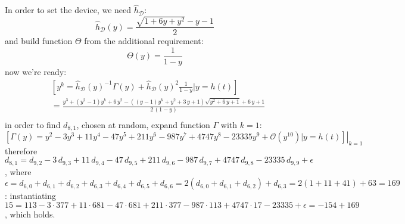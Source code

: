 In order to set the device, we need $\hat{h}_{\mathcal{D}}$:
\begin{displaymath} 
    \hat{h}_{\mathcal{D}}(y) = \frac{\sqrt{1+6y+y^2}-y-1}{2}
\end{displaymath} 
and build function $\Theta$ from the additional requirement:
\begin{displaymath} 
    \Theta(y) = \frac{1}{1-y}
\end{displaymath} 
now we're ready:
\begin{displaymath}
\begin{split}
    &\left[y^{k} = \hat{h}_{\mathcal{D}}(y)^{-1} \Gamma(y) + 
        \hat{h}_{\mathcal{D}}(y)^{2}\frac{1}{1-y} \big| y = h(t) \right]\\
    &= \frac{y^{3} + {\left(y^{2} - 1\right)} y^{k} + 6 \, y^{2} - {\left({\left(y - 1\right)} y^{k} + y^{2} + 3 \, y + 1\right)} \sqrt{y^{2} + 6 \, y + 1} + 6 \, y + 1}{2 \, {\left(1-y\right)}}\\
\end{split}
\end{displaymath}
in order to find $d_{8,1}$, chosen at random, expand function $\Gamma$ with $k=1$:
\begin{displaymath}
    \left.\left[\Gamma(y)=y^2 -3y^3 + 11y^4  -47y^5 + 211y^6 -987y^7 + 4747y^8 
        -23335y^9 + \mathcal{O}(y^{10}) \big| y = h(t) \right]\right|_{k=1}
\end{displaymath}
therefore $d_{8,1}=d_{9,2} -3\,d_{9,3} +11\,d_{9,4}-47\,d_{9,5} 
    +211\,d_{9,6} -987\,d_{9,7} +4747\,d_{9,8}-23335\,d_{9,9}+\epsilon$,
    where $\epsilon = d_{6,0}+d_{6,1}+d_{6,2}+d_{6,3}+d_{6,4}+d_{6,5}+d_{6,6} = 
            2(d_{6,0}+d_{6,1}+d_{6,2})+d_{6,3} = 2(1 + 11 + 41) + 63 = 169$: 
    instantiating $15 = 113 -3\cdot377 +11\cdot681 -47\cdot681 +211\cdot377
        -987\cdot113 +4747\cdot17 -23335 + \epsilon = -154 + 169$, which holds.

